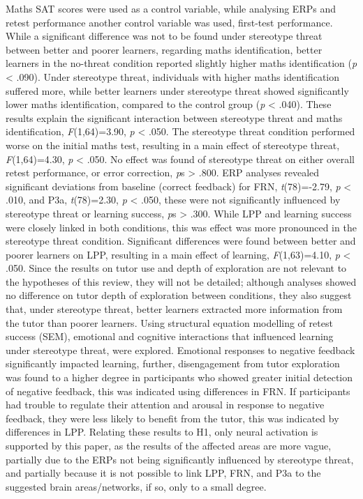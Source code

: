 \documentclass[
  stu,floatsintext]{apa7}
\begin{document}
Maths SAT scores were used as a control variable, while analysing ERPs and retest performance another control variable was used, first-test performance.\\
While a significant difference was not to be found under stereotype threat between better and poorer learners, regarding maths identification, better learners in the no-threat condition reported slightly higher maths identification (\emph{p} \textless{} .090).
Under stereotype threat, individuals with higher maths identification suffered more, while better learners under stereotype threat showed significantly lower maths identification, compared to the control group (\emph{p} \textless{} .040).
These results explain the significant interaction between stereotype threat and maths identification, \emph{F}(1,64)=3.90, \emph{p} \textless{} .050.
The stereotype threat condition performed worse on the initial maths test, resulting in a main effect of stereotype threat, \emph{F}(1,64)=4.30, \emph{p} \textless{} .050.
No effect was found of stereotype threat on either overall retest performance, or error correction, \emph{p}s \textgreater{} .800.
ERP analyses revealed significant deviations from baseline (correct feedback) for FRN, \emph{t}(78)=-2.79, \emph{p} \textless{} .010, and P3a, \emph{t}(78)=2.30, \emph{p} \textless{} .050, these were not significantly influenced by stereotype threat or learning success, \emph{p}s \textgreater{} .300.
While LPP and learning success were closely linked in both conditions, this was effect was more pronounced in the stereotype threat condition.
Significant differences were found between better and poorer learners on LPP, resulting in a main effect of learning, \emph{F}(1,63)=4.10, \emph{p} \textless{} .050.
Since the results on tutor use and depth of exploration are not relevant to the hypotheses of this review, they will not be detailed; although analyses showed no difference on tutor depth of exploration between conditions, they also suggest that, under stereotype threat, better learners extracted more information from the tutor than poorer learners.
Using structural equation modelling of retest success (SEM), emotional and cognitive interactions that influenced learning under stereotype threat, were explored.
Emotional responses to negative feedback significantly impacted learning, further, disengagement from tutor exploration was found to a higher degree in participants who showed greater initial detection of negative feedback, this was indicated using differences in FRN.
If participants had trouble to regulate their attention and arousal in response to negative feedback, they were less likely to benefit from the tutor, this was indicated by differences in LPP.
Relating these results to H1, only neural activation is supported by this paper, as the results of the affected areas are more vague, partially due to the ERPs not being significantly influenced by stereotype threat, and partially because it is not possible to link LPP, FRN, and P3a to the suggested brain areas/networks, if so, only to a small degree.
\end{document}
